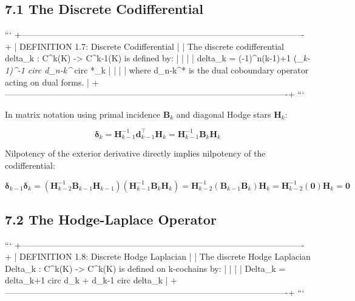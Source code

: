 \documentclass[11pt,twoside,openright]{amsbook}
\begin{document}
\subsection{7.1 The Discrete Codifferential}

```
+----------------------------------------------------------------------------------------------------+
| DEFINITION 1.7: Discrete Codifferential                                                            |
| The discrete codifferential delta_k : C^k(K) -> C^{k-1}(K) is defined by:                          |
|                                                                                                    |
|   delta_k = (-1)^{n(k-1)+1} (\textit{_{k-1})^{-1} circ d_{n-k}^} circ *_k                                 |
|                                                                                                    |
| where d_{n-k}^* is the dual coboundary operator acting on dual forms.                              |
+----------------------------------------------------------------------------------------------------+
```

In matrix notation using primal incidence $\mathbf{B}_k$ and diagonal Hodge stars $\mathbf{H}_k$:

$$\boldsymbol{\delta}_k = \mathbf{H}_{k-1}^{-1} \mathbf{d}_{k-1}^\top \mathbf{H}_k = \mathbf{H}_{k-1}^{-1} \mathbf{B}_k \mathbf{H}_k$$

Nilpotency of the exterior derivative directly implies nilpotency of the codifferential:

$$\boldsymbol{\delta}_{k-1} \boldsymbol{\delta}_k = (\mathbf{H}_{k-2}^{-1} \mathbf{B}_{k-1} \mathbf{H}_{k-1}) (\mathbf{H}_{k-1}^{-1} \mathbf{B}_k \mathbf{H}_k) = \mathbf{H}_{k-2}^{-1} (\mathbf{B}_{k-1} \mathbf{B}_k) \mathbf{H}_k = \mathbf{H}_{k-2}^{-1} (\mathbf{0}) \mathbf{H}_k = \mathbf{0}$$

\subsection{7.2 The Hodge-Laplace Operator}

```
+----------------------------------------------------------------------------------------------------+
| DEFINITION 1.8: Discrete Hodge Laplacian                                                           |
| The discrete Hodge Laplacian Delta_k : C^k(K) -> C^k(K) is defined on k-cochains by:              |
|                                                                                                    |
|   Delta_k = delta_{k+1} circ d_k + d_{k-1} circ delta_k                                            |
+----------------------------------------------------------------------------------------------------+
```
\end{document}

